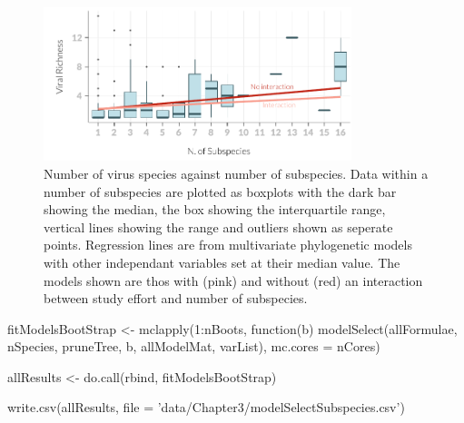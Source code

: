 \begin{knitrout}\footnotesize
{}\color{fgcolor}\begin{figure}[t]

{\centering \includegraphics[width=0.8\textwidth]{figure/boxplot-1} 

}

\caption[Number of virus species against number of subspecies]{Number of virus species against number of subspecies. 
Data within a number of subspecies are plotted as boxplots with the dark bar showing the median, the box showing the interquartile range, vertical lines showing the range and outliers shown as seperate points.
Regression lines are from multivariate phylogenetic models with other independant variables set at their median value.
The models shown are thos with (pink) and without (red) an interaction between study effort and number of subspecies.
}\label{fig:boxplot}
\end{figure}


\end{knitrout}




fitModelsBootStrap <- mclapply(1:nBoots, function(b) modelSelect(allFormulae, nSpecies, pruneTree, b, allModelMat, varList), mc.cores = nCores)

allResults <- do.call(rbind, fitModelsBootStrap)

write.csv(allResults, file = 'data/Chapter3/modelSelectSubspecies.csv')




